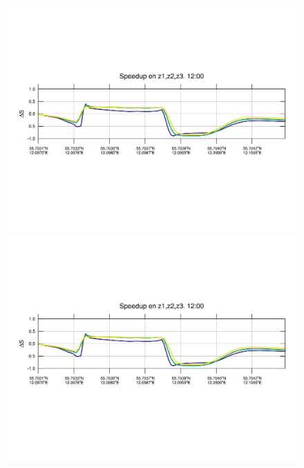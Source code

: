 \begin{figure}[H]
	\includegraphics[width=0.95\linewidth,trim={12mm 84mm 10mm 74mm},page=25,clip]{Imagenes/06/bol/speedup}\\%
	\includegraphics[width=0.95\linewidth,trim={12mm 84mm 10mm 74mm},page=37,clip]{Imagenes/06/bol/speedup}\\%

\end{figure}

